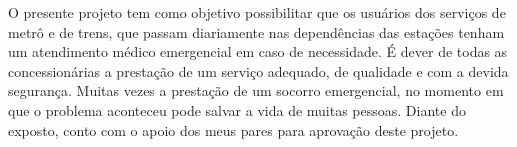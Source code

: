 \documentclass[10pt]{article}
\begin{document}
  O presente projeto tem como objetivo possibilitar que os usuários dos serviços de metrô e de trens, que passam diariamente nas dependências das estações tenham um atendimento médico emergencial em caso de necessidade. 
É dever de todas as concessionárias a prestação de um serviço adequado, de qualidade e com a devida segurança.
Muitas vezes a prestação de um socorro emergencial, no momento em que o problema aconteceu pode salvar a vida de muitas pessoas.
Diante do exposto, conto com o apoio dos meus pares para aprovação deste projeto.



\iffalse
\begin{center}
  \textbf{REFERÊNCIAS}
\end{center}


\fi
\end{document}

